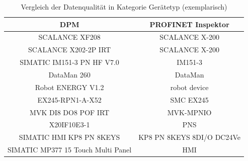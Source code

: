 \begin{table}[ht]
\centering
\caption{Vergleich der Datenqualität in Kategorie Gerätetyp (exemplarisch)}
\begin{tabular}{|c|c|}
\hline
\textbf{DPM} & \textbf{PROFINET Inspektor} \\
\hline
SCALANCE XF208 & SCALANCE X-200 \\
\hline
SCALANCE X202-2P IRT & SCALANCE X-200 \\
\hline
SIMATIC IM151-3 PN HF V7.0 & IM151-3\\
\hline
DataMan 260 & DataMan \\
\hline
Robot ENERGY V1.2 & robot device \\
\hline
EX245-RPN1-A-X52 &SMC EX245 \\
\hline
MVK DI8 DO8 POF IRT & MVK-MPNIO \\
\hline
X20IF10E3-1 & PNS \\
\hline
SIMATIC HMI KP8 PN 8KEYS  & KP8 PN 8KEYS 8DI/O DC24Ve \\
\hline
SIMATIC MP377 15 Touch Multi Panel & HMI \\
\hline
\end{tabular}
\label{tab:beispiel}
\end{table}

\bigskip 

